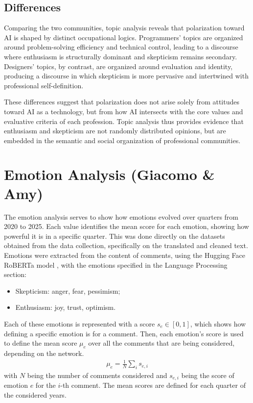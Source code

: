 \documentclass[conference]{IEEEtran}
\begin{document}
\subsection{Differences}
Comparing the two communities, topic analysis reveals that polarization toward AI is shaped by distinct occupational logics. Programmers’ topics are organized around problem-solving efficiency and technical control, leading to a discourse where enthusiasm is structurally dominant and skepticism remains secondary. Designers’ topics, by contrast, are organized around evaluation and identity, producing a discourse in which skepticism is more pervasive and intertwined with professional self-definition. 

These differences suggest that polarization does not arise solely from attitudes toward AI as a technology, but from how AI intersects with the core values and evaluative criteria of each profession. Topic analysis thus provides evidence that enthusiasm and skepticism are not randomly distributed opinions, but are embedded in the semantic and social organization of professional communities.

\section{Emotion Analysis (Giacomo \& Amy)}
The emotion analysis serves to show how emotions evolved over quarters from 2020 to 2025. Each value identifies the mean score for each emotion, showing how powerful it is in a specific quarter. This was done directly on the datasets obtained from the data collection, specifically on the translated and cleaned text. Emotions were extracted from the content of comments, using the Hugging Face RoBERTa model \cite{b23}, with the emotions specified in the Language Processing section:
\begin{itemize}
    \item Skepticism: anger, fear, pessimism;
    \item Enthusiasm: joy, trust, optimism.
\end{itemize}

Each of these emotions is represented with a score $s_e \in [0, 1]$, which shows how defining a specific emotion is for a comment. Then, each emotion's score is used to define the mean score $\mu_e$ over all the comments that are being considered, depending on the network.
\begin{align*}
    \mu_e = \frac 1N \sum_i s_{e,i}
\end{align*}
with $N$ being the number of comments considered and $s_{e,i}$ being the score of emotion $e$ for the $i$-th comment. The mean scores are defined for each quarter of the considered years.
\end{document}
